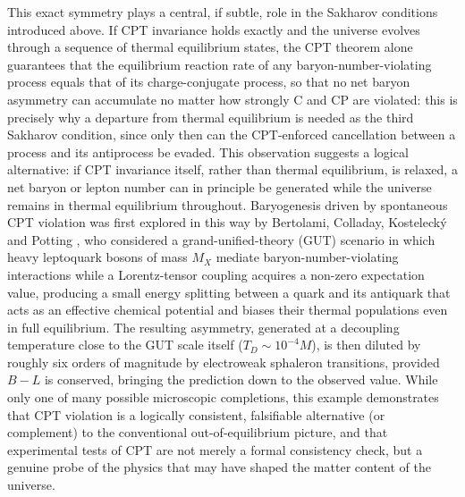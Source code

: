 This exact symmetry plays a central, if subtle, role in the Sakharov conditions introduced above. If CPT invariance holds exactly and the universe evolves through a sequence of thermal equilibrium states, the CPT theorem alone guarantees that the equilibrium reaction rate of any baryon-number-violating process equals that of its charge-conjugate process, so that no net baryon asymmetry can accumulate no matter how strongly C and CP are violated: this is precisely why a departure from thermal equilibrium is needed as the third Sakharov condition, since only then can the CPT-enforced cancellation between a process and its antiprocess be evaded. This observation suggests a logical alternative: if CPT invariance itself, rather than thermal equilibrium, is relaxed, a net baryon or lepton number can in principle be generated while the universe remains in thermal equilibrium throughout. Baryogenesis driven by spontaneous CPT violation was first explored in this way by Bertolami, Colladay, Kosteleck\'y and Potting \cite{Bertolami:1996ph}, who considered a grand-unified-theory (GUT) scenario in which heavy leptoquark bosons of mass $M_X$ mediate baryon-number-violating interactions while a Lorentz-tensor coupling acquires a non-zero expectation value, producing a small energy splitting between a quark and its antiquark that acts as an effective chemical potential and biases their thermal populations even in full equilibrium. The resulting asymmetry, generated at a decoupling temperature close to the GUT scale itself ($T_D \sim 10^{-4} M$), is then diluted by roughly six orders of magnitude by electroweak sphaleron transitions, provided $B-L$ is conserved, bringing the prediction down to the observed value. While only one of many possible microscopic completions, this example demonstrates that CPT violation is a logically consistent, falsifiable alternative (or complement) to the conventional out-of-equilibrium picture, and that experimental tests of CPT are not merely a formal consistency check, but a genuine probe of the physics that may have shaped the matter content of the universe.

